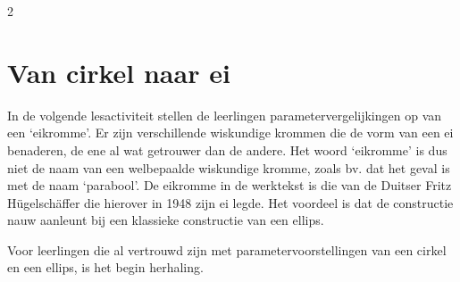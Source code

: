\begin{multicols}{2}


\section{Van cirkel naar ei}

    In de volgende lesactiviteit stellen de leerlingen parametervergelijkingen op van een `eikromme'. Er zijn verschillende wiskundige krommen die de vorm van een ei benaderen, de ene al wat getrouwer dan de andere. Het woord `eikromme' is dus niet de naam van een welbepaalde wiskundige kromme, zoals bv. dat het geval is met de naam `parabool'. De eikromme in de werktekst is die van de Duitser Fritz Hügelschäffer die hierover in 1948 zijn ei legde. Het voordeel is dat de constructie nauw aanleunt bij een klassieke constructie van een ellips.

    Voor leerlingen die al vertrouwd zijn met parametervoorstellingen van een cirkel en een ellips, is het begin herhaling.

 \end{multicols}
 

